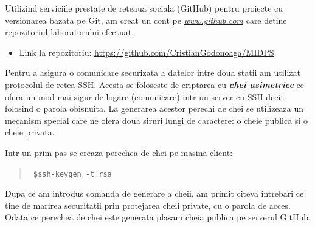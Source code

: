 Utilizind serviciile prestate de reteaua sociala (GitHub) pentru proiecte cu versionarea bazata pe Git, am creat un cont pe \emph{\url{www.github.com}} care detine repozitoriul laboratorului efectuat.

\newcommand*{\authorimg}[1]{%
	\raisebox{-.3\baselineskip}{%
		\texttt{[image: \#1]}%
	}%
}
\begin{itemize}
	\item[\authorimg{img/1.png}]
	\begin{center}
		Link la repozitoriu: \url{https://github.com/CristianGodonoaga/MIDPS}
	\end{center}
\end{itemize}


Pentru a asigura o comunicare securizata a datelor intre doua statii am utilizat protocolul de retea SSH. Acesta se foloseste de criptarea cu \emph{\textbf{\href{https://en.wikipedia.org/wiki/Public-key_cryptography}{chei asimetrice}}} ce ofera un mod mai sigur de logare (comunicare) intr-un server cu SSH decit folosind o parola obisnuita. La generarea acestor perechi de chei se utilizeaza un mecanism special care ne ofera doua siruri lungi de caractere: o cheie publica si o cheie privata.

Intr-un prim pas se creaza perechea de chei pe masina client:
\begin{quote}\tt
	\$ssh-keygen -t rsa \hfill
\end{quote}


Dupa ce am introdus comanda de generare a cheii, am primit citeva intrebari ce tine de marirea securitatii prin protejarea cheii private, cu o parola de acces. Odata ce perechea de chei este generata plasam cheia publica pe serverul GitHub.

